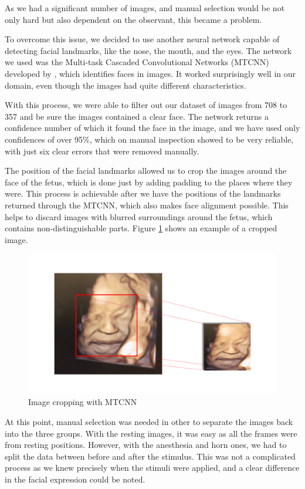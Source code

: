 As we had a significant number of images, and manual selection would be not only hard but also dependent on the observant, this became a problem.

To overcome this issue, we decided to use another neural network capable of detecting facial landmarks, like the nose, the mouth, and the eyes. The network we used was the Multi-task Cascaded Convolutional Networks (MTCNN) developed by \cite{ZhangZL016}, which identifies faces in images. It worked surprisingly well in our domain, even though the images had quite different characteristics.

With this process, we were able to filter out our dataset of images from 708 to 357 and be sure the images contained a clear face. The network returns a confidence number of which it found the face in the image, and we have used only confidences of over 95\%, which on manual inspection showed to be very reliable, with just six clear errors that were removed manually.

The position of the facial landmarks allowed us to crop the images around the face of the fetus, which is done just by adding padding to the places where they were. This process is achievable after we have the positions of the landmarks returned through the MTCNN, which also makes face alignment possible. This helps to discard images with blurred surroundings around the fetus, which contains non-distinguishable parts.  Figure \ref{fig:cropping} shows an example of a cropped image.

\begin{figure}[h!tp]
    \centering
    \includegraphics[width=.9\textwidth]{imgs/chap5_cropping.png}
    \caption{Image cropping with MTCNN}
    \label{fig:cropping}
\end{figure}

At this point, manual selection was needed in other to separate the images back into the three groups. With the resting images, it was easy as all the frames were from resting positions. However, with the anesthesia and horn ones, we had to split the data between before and after the stimulus. This was not a complicated process as we knew precisely when the stimuli were applied, and a clear difference in the facial expression could be noted.

